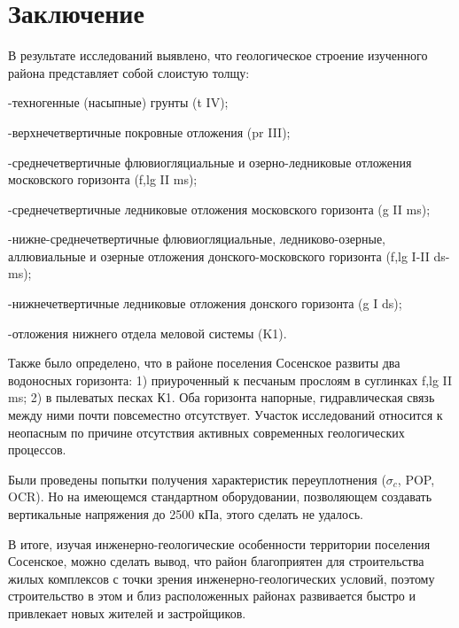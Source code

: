 \chapter{Заключение}\label{ch:ch8}

В результате исследований выявлено, что геологическое строение 
изученного района представляет собой слоистую толщу:

-техногенные (насыпные) грунты (t IV);

-верхнечетвертичные покровные отложения (pr III);

-среднечетвертичные флювиогляциальные и озерно-ледниковые отложения московского горизонта (f,lg II ms);

-среднечетвертичные ледниковые отложения московского горизонта (g II ms);

-нижне-среднечетвертичные флювиогляциальные, ледниково-озерные, аллювиальные и озерные 
отложения донского-московского горизонта (f,lg I-II ds-ms);

-нижнечетвертичные ледниковые отложения донского горизонта (g I ds);

-отложения нижнего отдела меловой системы (K1).

Также было определено, что в районе поселения Сосенское развиты два водоносных горизонта: 
1) приуроченный к песчаным прослоям в суглинках f,lg II ms; 2) в пылеватых песках К1. 
Оба горизонта напорные, гидравлическая связь между ними почти повсеместно отсутствует.
Участок исследований относится к неопасным по причине отсутствия активных современных 
геологических процессов.

Были проведены попытки получения характеристик переуплотнения ($\sigma_c$, POP, OCR). 
Но на имеющемся стандартном оборудовании, позволяющем создавать вертикальные 
напряжения до 2500 кПа, этого сделать не удалось.

В итоге, изучая инженерно-геологические особенности территории поселения Сосенское, 
можно сделать вывод, что район благоприятен для строительства жилых комплексов 
с точки зрения инженерно-геологических условий, поэтому строительство в этом и близ 
расположенных районах развивается быстро и привлекает новых жителей и застройщиков.